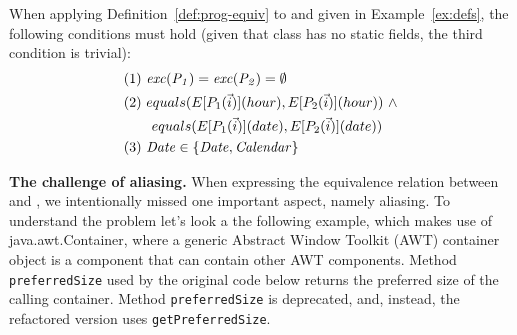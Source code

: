 \documentclass[sigconf,review,anonymous]{acmart}
\begin{document}
\begin{example}\label{ex:equiv}
  When applying Definition~\ref{def:prog-equiv} to  and  given in Example~\ref{ex:defs},
  the following conditions must hold (given that class  has no static fields, the third condition is trivial):
\[
\begin{aligned}
      & (1)~ \var{exc(P_1)}=\var{exc(P_2)} =\emptyset\\
      & (2)~ equals(E[P_1(\vec{i})](hour), E[P_2(\vec{i})](hour)) ~ \wedge\\ %
      & \qquad equals(E[P_1(\vec{i})](date), E[P_2(\vec{i})](date))\\
& (3)~  \var{Date} \in \{\var{Date}, \var{Calendar}\}
    \end{aligned}
    \]

 
    
\end{example}


{\bf The challenge of aliasing.}
%
When expressing the equivalence relation between  and , we
intentionally missed one important aspect, namely aliasing.  To understand
the problem let's look a the following example, which makes use of
java.awt.Container, where a generic Abstract Window Toolkit (AWT) container
object is a component that can contain other AWT components.  Method
\texttt{preferredSize} used by the original code below returns the preferred
size of the calling container. Method
\texttt{preferredSize} is deprecated, and, instead, the refactored version
uses \texttt{getPreferredSize}.

\end{document}
